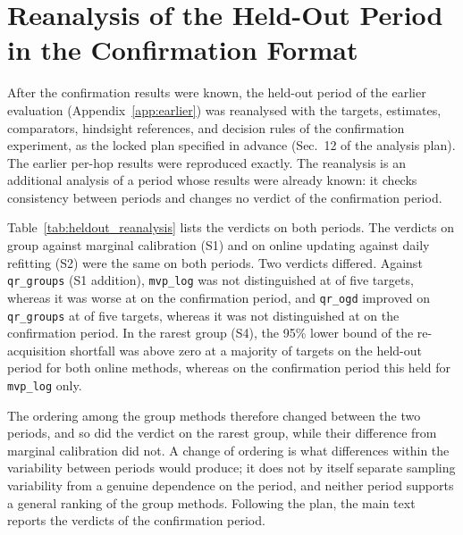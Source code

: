 \section{Reanalysis of the Held-Out Period in the Confirmation Format}
\label{supp:reanalysis}

After the confirmation results were known, the held-out period of the earlier
evaluation (Appendix~\ref{app:earlier}) was reanalysed with the targets,
estimates, comparators, hindsight references, and decision rules of the
confirmation experiment, as the locked plan specified in advance (Sec.~12 of the
analysis plan). The
earlier per-hop results were reproduced exactly. The reanalysis is an additional
analysis of a period whose results were already known: it checks consistency
between periods and changes no verdict of the confirmation period.

Table~\ref{tab:heldout_reanalysis} lists the verdicts on both periods. The
verdicts on group against marginal calibration (S1) and on online updating
against daily refitting (S2) were the same on both periods.
Two verdicts differed. Against \texttt{qr\_groups} (S1 addition),
\texttt{mvp\_log} was not distinguished at \ctwoHeldEqualCountQrGroupsMvpLog{} of
five targets, whereas it was worse at \ctwoWorseCountQrGroupsMvpLog{} on the
confirmation period, and \texttt{qr\_ogd} improved on \texttt{qr\_groups} at
\ctwoHeldImprovedCountQrGroupsQrOgd{} of five targets, whereas it was not
distinguished at \ctwoEqualCountQrGroupsQrOgd{} on the confirmation period. In the rarest group (S4), the 95\% lower bound of the re-acquisition shortfall
was above zero at a majority of targets on the held-out period for both online
methods, whereas on the confirmation period this held for \texttt{mvp\_log} only.

The ordering among the group methods therefore changed between the two periods,
and so did the verdict on the rarest group, while their difference from marginal
calibration did not. A change of ordering is
what differences within the variability between periods would produce; it does
not by itself separate sampling variability from a genuine dependence on the
period, and neither period supports a general ranking of the group methods.
Following the plan, the main text reports the verdicts of the confirmation period.


